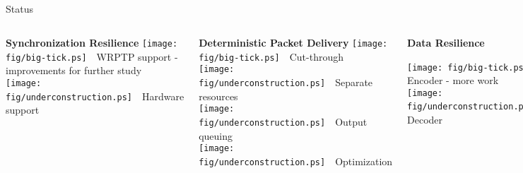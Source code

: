 \documentclass[compress,red]{beamer}
\begin{document}
\subsection{}
\begin{frame}{Status}


\begin{columns}[c]

    \begin{block}{{\bf Synchronization Resilience}}
      \texttt{[image: fig/big-tick.ps]}~~WRPTP support - improvements for further study \\
      \texttt{[image: fig/underconstruction.ps]}~~Hardware support     
    \end{block}

    \begin{block}{{\bf Deterministic Packet Delivery}}
      \texttt{[image: fig/big-tick.ps]}~~Cut-through \\
      \texttt{[image: fig/underconstruction.ps]}~~Separate resources \\
      \texttt{[image: fig/underconstruction.ps]}~~Output queuing \\
      \texttt{[image: fig/underconstruction.ps]}~~Optimization    
    \end{block}

    \begin{block}{{\bf Data Resilience}}

      \texttt{[image: fig/big-tick.ps]}~~FEC Encoder - more work \\
      \texttt{[image: fig/underconstruction.ps]}~~FEC Decoder    

    \end{block}

    \begin{block}{ {\bf Topology redundancy}}
      \texttt{[image: fig/big-tick.ps]}~~Extensive study \\
      \texttt{[image: fig/underconstruction.ps]}~~Hardware/software    
    \end{block}

    \begin{block}{  {\bf Diagnostics}}
      \texttt{[image: fig/underconstruction.ps]}~~Software
    \end{block}


\end{columns}
\end{frame}
\end{document}
